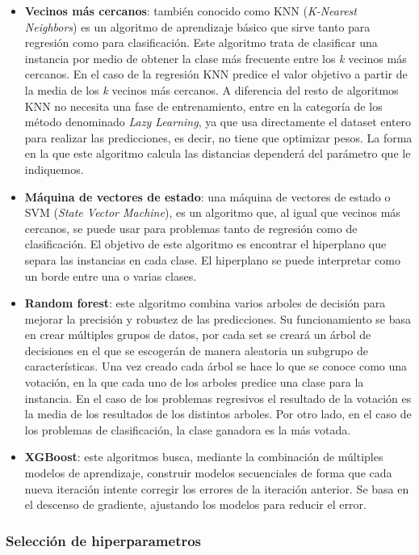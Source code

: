 \begin{itemize}
\item \textbf{Vecinos más cercanos}: también conocido como KNN (\textit{K-Nearest Neighbors}) es un algoritmo de aprendizaje básico que sirve tanto para regresión como para clasificación. Este algoritmo trata de clasificar una instancia por medio de obtener la clase más frecuente entre los \textit{k} vecinos más cercanos. En el caso de la regresión KNN predice el valor objetivo a partir de la media de los \textit{k} vecinos más cercanos. A diferencia del resto de algoritmos KNN no necesita una fase de entrenamiento, entre en la categoría de los método denominado \textit{Lazy Learning}, ya que usa directamente el dataset entero para realizar las predicciones, es decir, no tiene que optimizar pesos. La forma en la que este algoritmo calcula las distancias dependerá del parámetro que le indiquemos.
\item \textbf{Máquina de vectores de estado}: una máquina de vectores de estado o SVM (\textit{State Vector Machine}), es un algoritmo que, al igual que vecinos más cercanos, se puede usar para problemas tanto de regresión como de clasificación. El objetivo de este algoritmo es encontrar el hiperplano que separa las instancias en cada clase. El hiperplano se puede interpretar como un borde entre una o varias clases. 
\item \textbf{Random forest}: este algoritmo combina varios arboles de decisión para mejorar la precisión y robustez de las predicciones. Su funcionamiento se basa en crear múltiples grupos de datos, por cada set se creará un árbol de decisiones en el que se escogerán de manera aleatoria un subgrupo de características. Una vez creado cada árbol se hace lo que se conoce como una votación, en la que cada uno de los arboles predice una clase para la instancia. En el caso de los problemas regresivos el resultado de la votación es la media de los resultados de los distintos arboles. Por otro lado, en el caso de los problemas de clasificación, la clase ganadora es la más votada.
\item \textbf{XGBoost}: este algoritmos busca, mediante la combinación de múltiples modelos de aprendizaje, construir modelos secuenciales de forma que cada nueva iteración intente corregir los errores de la iteración anterior. Se basa en el descenso de gradiente, ajustando los modelos para reducir el error.
\end{itemize}
\subsubsection{Selección de hiperparametros}

